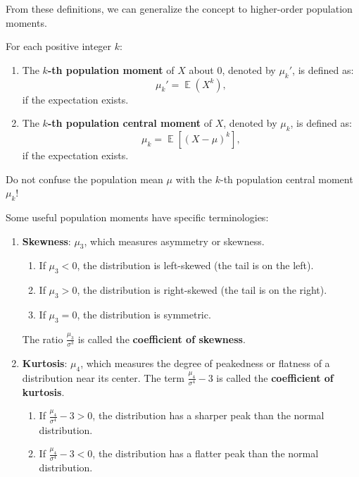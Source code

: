 \documentclass{huhtakm-template-book-v2}
\DeclareMathOperator{\E}{\mathbb{E}}
\begin{document}
    From these definitions, we can generalize the concept to higher-order population moments.
    \begin{defn}
        For each positive integer $k$:
        \begin{enumerate}
            \item The \textbf{$k$-th population moment} of $X$ about $0$, denoted by $\mu_{k}'$, is defined as:
            \begin{equation*}
                \mu_{k}' = \E(X^{k}),
            \end{equation*}
            if the expectation exists.
            \item The \textbf{$k$-th population central moment} of $X$, denoted by $\mu_{k}$, is defined as:
            \begin{equation*}
                \mu_{k} = \E[(X - \mu)^{k}],
            \end{equation*}
            if the expectation exists.
        \end{enumerate}
    \end{defn}
    \begin{rem}
        Do not confuse the population mean $\mu$ with the $k$-th population central moment $\mu_{k}$!
    \end{rem}
    \begin{eg}
        Some useful population moments have specific terminologies:
        \begin{enumerate}
            \item \textbf{Skewness}: $\mu_{3}$, which measures asymmetry or skewness.
            \begin{enumerate}
                \item If $\mu_{3} < 0$, the distribution is left-skewed (the tail is on the left).
                \item If $\mu_{3} > 0$, the distribution is right-skewed (the tail is on the right).
                \item If $\mu_{3} = 0$, the distribution is symmetric.
            \end{enumerate}
            The ratio $\frac{\mu_{3}}{\sigma^{3}}$ is called the \textbf{coefficient of skewness}.
            \item \textbf{Kurtosis}: $\mu_{4}$, which measures the degree of peakedness or flatness of a distribution near its center. The term $\frac{\mu_{4}}{\sigma^{4}} - 3$ is called the \textbf{coefficient of kurtosis}.
            \begin{enumerate}
                \item If $\frac{\mu_{4}}{\sigma^{4}} - 3 > 0$, the distribution has a sharper peak than the normal distribution.
                \item If $\frac{\mu_{4}}{\sigma^{4}} - 3 < 0$, the distribution has a flatter peak than the normal distribution.
            \end{enumerate}
        \end{enumerate}
    \end{eg}
\end{document}
